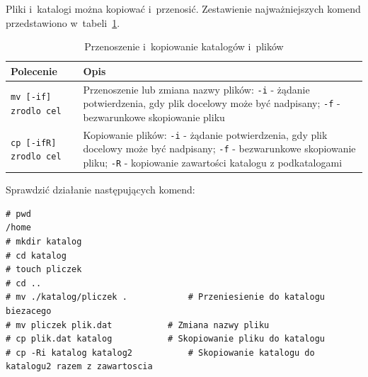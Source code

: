 \begin{example}

Pliki i~katalogi można kopiować i~przenosić. Zestawienie najważniejszych komend przedstawiono w~tabeli~\ref{tab:przenos}.

\begin{table}[h!]
\centering
\caption{Przenoszenie i~kopiowanie katalogów i~plików}
\setlength{\arrayrulewidth}{1pt}
\setlength{\tabcolsep}{6pt}
\renewcommand{\arraystretch}{1.2}
\begin{tabular}{ |p{}|p{}|}
\hline \rowcolor{gray}
\textbf{Polecenie} & \textbf{Opis} \\ \hline
\mbox{\lstinline[deletekeywords={if}]{mv [-if] zrodlo cel}} & Przenoszenie lub zmiana nazwy plików: \mbox{\lstinline[style=MyBashStyle]{-i}} - żądanie potwierdzenia, gdy plik docelowy może być nadpisany; \mbox{\lstinline[style=MyBashStyle]{-f}} - bezwarunkowe skopiowanie pliku \\ \hline
\mbox{\lstinline[style=MyBashStyle]{cp [-ifR] zrodlo cel}}  & Kopiowanie plików: \mbox{\lstinline[style=MyBashStyle]{-i}} - żądanie potwierdzenia, gdy plik docelowy może być nadpisany; \mbox{\lstinline[style=MyBashStyle]{-f}} - bezwarunkowe skopiowanie pliku; \mbox{\lstinline[style=MyBashStyle]{-R}} - kopiowanie zawartości katalogu z podkatalogami \\ \hline
\end{tabular}
\label{tab:przenos}
\end{table}

Sprawdzić działanie następujących komend:

\begin{lstlisting}[style=MyBashStyle]
# pwd
/home
# mkdir katalog
# cd katalog
# touch pliczek
# cd ..
# mv ./katalog/pliczek .			# Przeniesienie do katalogu biezacego
# mv pliczek plik.dat			# Zmiana nazwy pliku
# cp plik.dat katalog			# Skopiowanie pliku do katalogu
# cp -Ri katalog katalog2			# Skopiowanie katalogu do katalogu2 razem z zawartoscia
\end{lstlisting}
\end{example}


